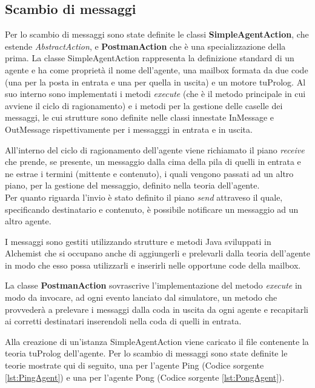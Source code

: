 \documentclass[12pt,a4paper,openright,twoside]{report}
\begin{document}
\subsection{Scambio di messaggi}\label{subsec:ScambioMessaggi}
Per lo scambio di messaggi sono state definite le classi \textbf{SimpleAgentAction}, che estende \textit{AbstractAction}, e \textbf{PostmanAction} che \`e una specializzazione della prima. La classe SimpleAgentAction rappresenta la definizione standard di un agente e ha come propriet\`a il nome dell'agente, una mailbox formata da due code (una per la posta in entrata e una per quella in uscita) e un motore tuProlog. Al suo interno sono implementati i metodi \textit{execute} (che \`e il metodo principale in cui avviene il ciclo di ragionamento) e i metodi per la gestione delle caselle dei messaggi, le cui strutture sono definite nelle classi innestate InMessage e OutMessage rispettivamente per i messagggi in entrata e in uscita.

All'interno del ciclo di ragionamento dell'agente viene richiamato il piano \textit{receive} che prende, se presente, un messaggio dalla cima della pila di quelli in entrata e ne estrae i termini (mittente e contenuto), i quali vengono passati ad un altro piano, per la gestione del messaggio, definito nella teoria dell'agente.
\\
Per quanto riguarda l'invio \`e stato definito il piano \textit{send} attraveso il quale, specificando destinatario e contenuto, \`e possibile notificare un messaggio ad un altro agente.

I messaggi sono gestiti utilizzando strutture e metodi Java sviluppati in Alchemist che si occupano anche di aggiungerli e prelevarli dalla teoria dell'agente in modo che esso possa utilizzarli e inserirli nelle opportune code della mailbox.

La classe \textbf{PostmanAction} sovrascrive l'implementazione del metodo \textit{execute} in modo da invocare, ad ogni evento lanciato dal simulatore, un metodo che provveder\`a a prelevare i messaggi dalla coda in uscita da ogni agente e recapitarli ai corretti destinatari inserendoli nella coda di quelli in entrata.

Alla creazione di un'istanza SimpleAgentAction viene caricato il file contenente la teoria tuProlog dell'agente. Per lo scambio di messaggi sono state definite le teorie mostrate qui di seguito, una per l'agente Ping (Codice sorgente \ref{lst:PingAgent}) e una per l'agente Pong (Codice sorgente \ref{lst:PongAgent}).
\end{document}
